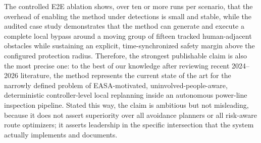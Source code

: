 \documentclass[a4paper,11pt]{article}
\begin{document}
The controlled E2E ablation shows, over ten or more runs per scenario, that the overhead of enabling the method under detections is small and stable, while the audited case study demonstrates that the method can generate and execute a complete local bypass around a moving group of fifteen tracked human-adjacent obstacles while sustaining an explicit, time-synchronized safety margin above the configured protection radius. Therefore, the strongest publishable claim is also the most precise one: to the best of our knowledge after reviewing recent 2024--2026 literature, the method represents the current state of the art for the narrowly defined problem of EASA-motivated, uninvolved-people-aware, deterministic controller-level local replanning inside an autonomous power-line inspection pipeline. Stated this way, the claim is ambitious but not misleading, because it does not assert superiority over all avoidance planners or all risk-aware route optimizers; it asserts leadership in the specific intersection that the system actually implements and documents.
\end{document}

